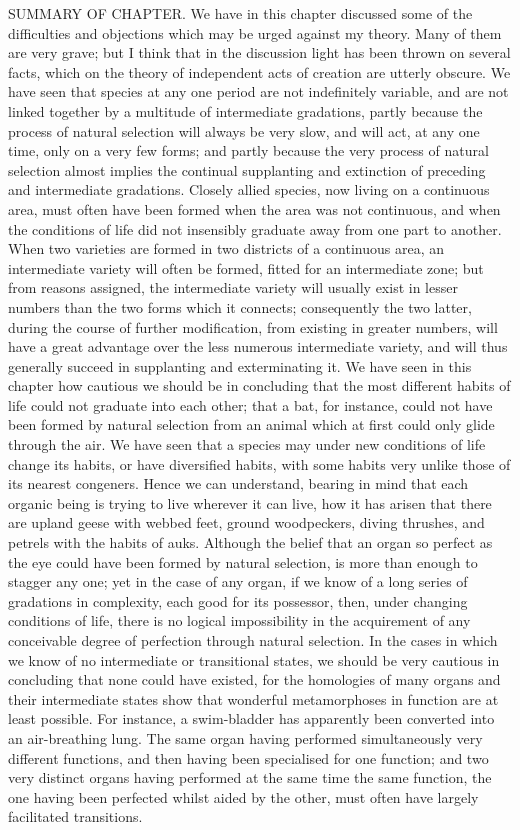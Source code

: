 SUMMARY OF CHAPTER.
We have in this chapter discussed some of the difficulties and objections which may be urged against my theory. Many of them are very grave; but I think that in the discussion light has been thrown on several facts, which on the theory of independent acts of creation are utterly obscure. We have seen that species at any one period are not indefinitely variable, and are not linked together by a multitude of intermediate gradations, partly because the process of natural selection will always be very slow, and will act, at any one time, only on a very few forms; and partly because the very process of natural selection almost implies the continual supplanting and extinction of preceding and intermediate gradations. Closely allied species, now living on a continuous area, must often have been formed when the area was not continuous, and when the conditions of life did not insensibly graduate away from one part to another. When two varieties are formed in two districts of a continuous area, an intermediate variety will often be formed, fitted for an intermediate zone; but from reasons assigned, the intermediate variety will usually exist in lesser numbers than the two forms which it connects; consequently the two latter, during the course of further modification, from existing in greater numbers, will have a great advantage over the less numerous intermediate variety, and will thus generally succeed in supplanting and exterminating it.
We have seen in this chapter how cautious we should be in concluding that the most different habits of life could not graduate into each other; that a bat, for instance, could not have been formed by natural selection from an animal which at first could only glide through the air.
We have seen that a species may under new conditions of life change its habits, or have diversified habits, with some habits very unlike those of its nearest congeners. Hence we can understand, bearing in mind that each organic being is trying to live wherever it can live, how it has arisen that there are upland geese with webbed feet, ground woodpeckers, diving thrushes, and petrels with the habits of auks.
Although the belief that an organ so perfect as the eye could have been formed by natural selection, is more than enough to stagger any one; yet in the case of any organ, if we know of a long series of gradations in complexity, each good for its possessor, then, under changing conditions of life, there is no logical impossibility in the acquirement of any conceivable degree of perfection through natural selection. In the cases in which we know of no intermediate or transitional states, we should be very cautious in concluding that none could have existed, for the homologies of many organs and their intermediate states show that wonderful metamorphoses in function are at least possible. For instance, a swim-bladder has apparently been converted into an air-breathing lung. The same organ having performed simultaneously very different functions, and then having been specialised for one function; and two very distinct organs having performed at the same time the same function, the one having been perfected whilst aided by the other, must often have largely facilitated transitions.
